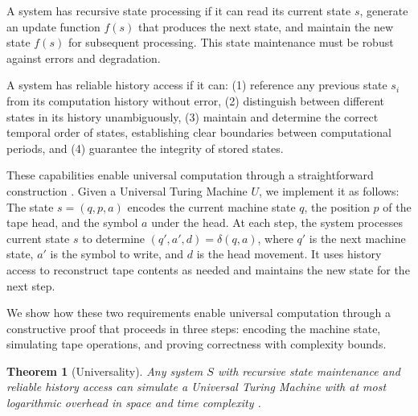 \documentclass[12pt]{article}
\newtheorem{theorem}{Theorem}
\begin{document}
A system has recursive state processing if it can read its current state $s$, generate an update function $f(s)$ that produces the next state, and maintain the new state $f(s)$ for subsequent processing.
This state maintenance must be robust against errors and degradation.

A system has reliable history access if it can: (1) reference any previous state $s_i$ from its computation history without error, (2) distinguish between different states in its history unambiguously, (3) maintain and determine the correct temporal order of states, establishing clear boundaries between computational periods, and (4) guarantee the integrity of stored states.

These capabilities enable universal computation through a straightforward construction \cite{sipser1996introduction,deutsch1995universality,bennett1989time}.
Given a Universal Turing Machine $U$, we implement it as follows: The state $s = (q, p, a)$ encodes the current machine state $q$, the position $p$ of the tape head, and the symbol $a$ under the head.
At each step, the system processes current state $s$ to determine $(q', a', d) = \delta(q, a)$, where $q'$ is the next machine state, $a'$ is the symbol to write, and $d$ is the head movement.
It uses history access to reconstruct tape contents as needed and maintains the new state for the next step.

We show how these two requirements enable universal computation through a constructive proof that proceeds in three steps: encoding the machine state, simulating tape operations, and proving correctness with complexity bounds.

\vspace{1em}

\begin{theorem}[Universality]
Any system $S$ with recursive state maintenance and reliable history access can simulate a Universal Turing Machine with at most logarithmic overhead in space and time complexity \cite{boyle2024memory,liskiewicz1994complexity}.
\end{theorem}
\end{document}
